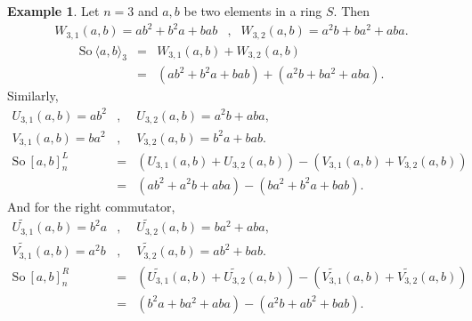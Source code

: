 \documentclass[12pt]{amsart}
\theoremstyle{definition}
\newtheorem{eg}[theorem]{Example}
\numberwithin{equation}{section}
\begin{document}
\begin{eg}\label{EG: Example to show definition and remark are same for higher degree anticommutators, commutators}
    Let $n=3$ and $a,b$ be two elements in a ring $S$. Then
    \begin{eqnarray*}
        W_{3,1}(a,b) = ab^2+b^2a+bab &,& W_{3,2}(a,b) = a^2b+ba^2+aba.
        \end{eqnarray*}
        \begin{eqnarray*}
        \text{So}~\langle a,b \rangle_3 &=& W_{3,1}(a,b)+W_{3,2}(a,b) \\
        &=& (ab^2+b^2a+bab) + (a^2b+ba^2+aba).
    \end{eqnarray*}
    Similarly, 
    \begin{eqnarray*}
    U_{3,1}(a,b) = ab^2&,& 
    U_{3,2}(a,b)= a^2b+aba, \\
    V_{3,1}(a,b)= ba^2&,&  
    V_{3,2}(a,b) = b^2a+bab. \\
        \text{So}~ \left[a,b\right]_n^L &=& (U_{3,1}(a,b)+U_{3,2}(a,b)) - (V_{3,1}(a,b) + V_{3,2}(a,b)) \\
        &=& (ab^2+a^2b+aba)-(ba^2+b^2a+bab).
    \end{eqnarray*}
      And for the right commutator,
    \begin{eqnarray*}
        \widetilde{U_{3,1}}(a,b) = b^2a&,& 
        \widetilde{U_{3,2}}(a,b) = ba^2+aba, \\
        \widetilde{V_{3,1}}(a,b) = a^2b&,& 
        \widetilde{V_{3,2}}(a,b) = ab^2+bab.\\
         \text{So}~\left[a,b\right]_{n}^R &=&(\widetilde{U_{3,1}}(a,b)+\widetilde{U_{3,2}}(a,b)) - (\widetilde{V_{3,1}}(a,b) + \widetilde{V_{3,2}}(a,b)) \\
        &=&(b^2a+ba^2+aba) - (a^2b+ab^2+bab).    
        \end{eqnarray*}
    

\end{eg}
\end{document}
